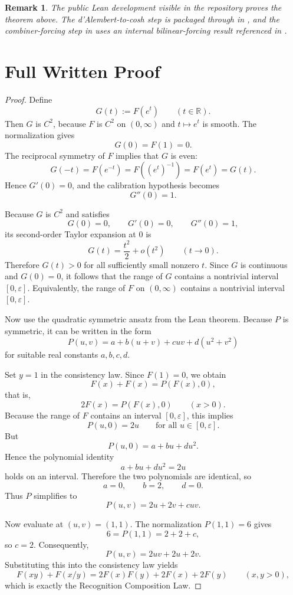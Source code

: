 \documentclass[11pt]{article}
\theoremstyle{plain}
\newtheorem{remark}{Remark}
\newcommand{\RR}{\mathbb{R}}
\begin{document}
\begin{remark}
The public Lean development visible in the repository proves the theorem above.
The d'Alembert-to-cosh step is packaged through
 in
, and the combiner-forcing
step in  uses an internal
bilinear-forcing result referenced in
.
\end{remark}

\section*{Full Written Proof}
\begin{proof}
Define
\[
G(t):=F(e^t) \qquad (t\in\RR).
\]
Then $G$ is $C^2$, because $F$ is $C^2$ on $(0,\infty)$ and $t\mapsto e^t$ is
smooth. The normalization gives
\[
G(0)=F(1)=0.
\]
The reciprocal symmetry of $F$ implies that $G$ is even:
\[
G(-t)=F(e^{-t})=F((e^t)^{-1})=F(e^t)=G(t).
\]
Hence $G'(0)=0$, and the calibration hypothesis becomes
\[
G''(0)=1.
\]

Because $G$ is $C^2$ and satisfies
\[
G(0)=0,\qquad G'(0)=0,\qquad G''(0)=1,
\]
its second-order Taylor expansion at $0$ is
\[
G(t)=\frac{t^2}{2}+o(t^2)\qquad (t\to 0).
\]
Therefore $G(t)>0$ for all sufficiently small nonzero $t$. Since $G$ is
continuous and $G(0)=0$, it follows that the range of $G$ contains a nontrivial
interval $[0,\varepsilon]$. Equivalently, the range of $F$ on $(0,\infty)$
contains a nontrivial interval $[0,\varepsilon]$.

Now use the quadratic symmetric ansatz from the Lean theorem. Because $P$ is
symmetric, it can be written in the form
\[
P(u,v)=a+b(u+v)+cuv+d(u^2+v^2)
\]
for suitable real constants $a,b,c,d$.

Set $y=1$ in the consistency law. Since $F(1)=0$, we obtain
\[
F(x)+F(x)=P(F(x),0),
\]
that is,
\[
2F(x)=P(F(x),0)\qquad (x>0).
\]
Because the range of $F$ contains an interval $[0,\varepsilon]$, this implies
\[
P(u,0)=2u\qquad \text{for all }u\in[0,\varepsilon].
\]
But
\[
P(u,0)=a+bu+du^2.
\]
Hence the polynomial identity
\[
a+bu+du^2=2u
\]
holds on an interval. Therefore the two polynomials are identical, so
\[
a=0,\qquad b=2,\qquad d=0.
\]
Thus $P$ simplifies to
\[
P(u,v)=2u+2v+cuv.
\]

Now evaluate at $(u,v)=(1,1)$. The normalization $P(1,1)=6$ gives
\[
6=P(1,1)=2+2+c,
\]
so $c=2$. Consequently,
\[
P(u,v)=2uv+2u+2v.
\]
Substituting this into the consistency law yields
\[
F(xy)+F(x/y)=2F(x)F(y)+2F(x)+2F(y)\qquad (x,y>0),
\]
which is exactly the Recognition Composition Law.


\end{proof}
\end{document}
